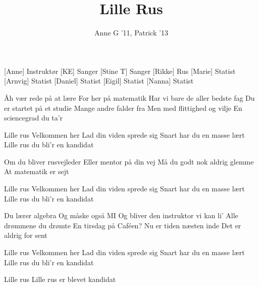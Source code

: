 \documentclass[a4paper,11pt]{article}
\title{Lille Rus}
\author{Anne G '11, Patrick '13}
\begin{document}
\maketitle

\begin{roles}
[Anne] Instruktør
[KE] Sanger
[Stine T] Sanger
[Rikke] Rus
[Marie] Statist
[Arnvig] Statist
[Daniel] Statist
[Eigil] Statist
[Nanna] Statist
\end{roles}

\begin{song}
 Åh vær rede på at lære
For her på matematik
Har vi bare de aller bedste fag
 Du er startet på et studie
Mange andre falder fra
Men med flittighed og vilje
En sciencegrad du ta'r

 Lille rus Velkommen her
Lad din viden sprede sig
Snart har du en masse lært
Lille rus du bli'r en kandidat

 Om du bliver rusvejleder
 Eller mentor på din vej
 Må du godt nok aldrig glemme
 At matematik er sejt

 Lille rus Velkommen her
Lad din viden sprede sig
Snart har du en masse lært
Lille rus du bli'r en kandidat

 Du lærer algebra
Og måske også MI
Og bliver den instruktor vi kan li'
 Alle drømmene du drømte
En tirsdag på Caféen?
 Nu er tiden næsten inde
Det er aldrig for sent

 Lille rus Velkommen her
Lad din viden sprede sig
Snart har du en masse lært
Lille rus du bli'r en kandidat

Lille rus
Lille rus er blevet kandidat
\end{song}
\end{document}
